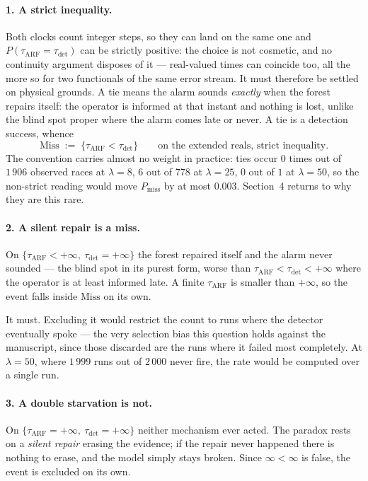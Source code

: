 \documentclass[11pt,a4paper]{article}
\begin{document}
\paragraph{1. A strict inequality.} Both clocks count integer steps, so they can land on
the same one and $P(\tau_{\mathrm{ARF}} = \tau_{\mathrm{det}})$ can be strictly positive:
the choice is not cosmetic, and no continuity argument disposes of it --- real-valued
times can coincide too, all the more so for two functionals of the same error stream.
It must therefore be settled on physical grounds. A tie means the alarm sounds
\emph{exactly} when the forest repairs itself: the operator is informed at that instant
and nothing is lost, unlike the blind spot proper where the alarm comes late or never. A
tie is a detection success, whence
\[
  \mathrm{Miss} \;:=\; \{\tau_{\mathrm{ARF}} < \tau_{\mathrm{det}}\}
  \qquad\text{on the extended reals, strict inequality.}
\]
The convention carries almost no weight in practice: ties occur $0$ times out of
$1\,906$ observed races at $\lambda = 8$, $6$ out of $778$ at $\lambda = 25$, $0$ out of
$1$ at $\lambda = 50$, so the non-strict reading would move $P_{\mathrm{miss}}$ by at
most $0.003$. Section~4 returns to why they are this rare.

\paragraph{2. A silent repair is a miss.} On
$\{\tau_{\mathrm{ARF}} < +\infty,\ \tau_{\mathrm{det}} = +\infty\}$ the forest repaired
itself and the alarm never sounded --- the blind spot in its purest form, worse than
$\tau_{\mathrm{ARF}} < \tau_{\mathrm{det}} < +\infty$ where the operator is at least
informed late. A finite $\tau_{\mathrm{ARF}}$ is smaller than $+\infty$, so the event
falls inside $\mathrm{Miss}$ on its own.

It must. Excluding it would restrict the count to runs where the detector eventually
spoke --- the very selection bias this question holds against the manuscript, since those
discarded are the runs where it failed most completely. At $\lambda = 50$, where $1\,999$
runs out of $2\,000$ never fire, the rate would be computed over a single run.

\paragraph{3. A double starvation is not.} On
$\{\tau_{\mathrm{ARF}} = +\infty,\ \tau_{\mathrm{det}} = +\infty\}$ neither mechanism
ever acted. The paradox rests on a \emph{silent repair} erasing the evidence; if the
repair never happened there is nothing to erase, and the model simply stays broken. Since
$\infty < \infty$ is false, the event is excluded on its own.
\end{document}
